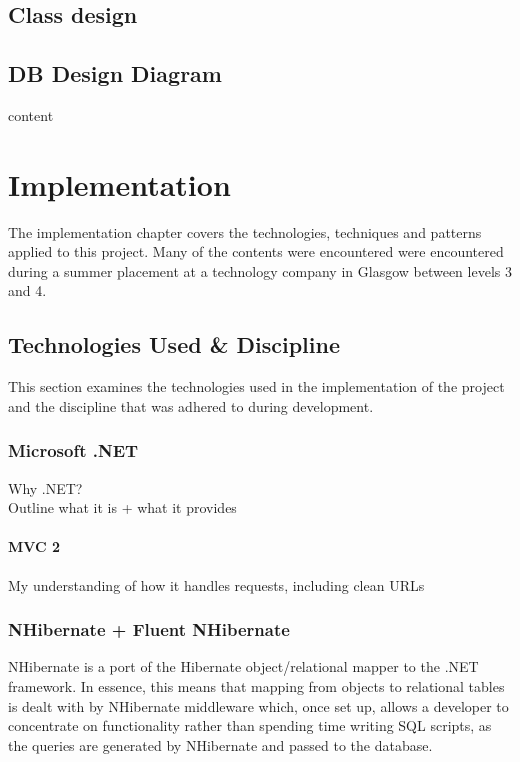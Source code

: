 \documentclass{l4proj}
\begin{document}
\section{Class design}

\section{DB Design Diagram}
content


\chapter{Implementation}
\label{impl}
The implementation chapter covers the technologies, techniques and patterns applied to this project.  Many of the contents were encountered were encountered during a summer placement at a technology company in Glasgow between levels 3 and 4.  

\section{Technologies Used \& Discipline}
This section examines the technologies used in the implementation of the project and the discipline that was adhered to during development.

\subsection{Microsoft .NET}
Why .NET?\\
Outline what it is + what it provides\\

\subsubsection{MVC 2}
My understanding of how it handles requests, including clean URLs


\subsection{NHibernate + Fluent NHibernate}
NHibernate is a port of the Hibernate object/relational mapper to the .NET framework. In essence, this means that mapping from objects to relational tables is dealt with by NHibernate middleware which, once set up, allows a developer to concentrate on functionality rather than spending time writing SQL scripts, as the queries are generated by NHibernate and passed to the database.  \\
\end{document}
